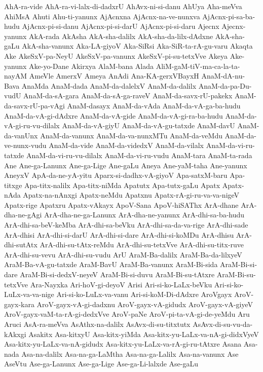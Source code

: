 {AhA-ra-vide
AhA-ra-vi-lalx-di-dadxrU
AhAvx-ni-si-danu
AhUya
Aha-meVva
AhiMsA
Ahuti
Ahu-ti-yanunx
AjAcnxna
AjAcnx-na-ve-nunxva
AjAcnx-pi-sa-ba-hudu
AjAcnx-pi-si-danu
AjAcnx-pi-si-darU
AjAcnx-pi-si-daru
Ajecnx
Ajecnx-yanunx
AkA-rada
AkAsha
AkA-sha-dalilx
AkA-sha-da-lilx-dAdxne
AkA-sha-gaLu
AkA-sha-vanunx
Aka-LA-giyoV
Aka-SiRsi
Aka-SiR-ta-rA-gu-varu
Akaqta
Ake
AkeSxV-pa-NeyU
AkeSxV-pa-vanunx
AkeSxV-pi-su-tetxVve
Akeya
Ake-yanunx
Ake-yo-Dane
Akirxya
AlaM-bana
Alada
AliM-gaM-tiV-ma-ca-la-ta-nayAM
AmeVle
AmerxV
Ameya
AnAdi
Ana-KA-gerxVBayxH
AnaM-dA-nu-Bava
AnaMda
AnaM-dada
AnaM-da-dalelxV
AnaM-da-dalilx
AnaM-da-pa-Du-vudU
AnaM-da-sA-gara
AnaM-da-sA-ga-raveV
AnaM-da-savx-rU-pakekx
AnaM-da-savx-rU-pa-vAgi
AnaM-dasayx
AnaM-da-vAda
AnaM-da-vA-ga-ba-hudu
AnaM-da-vA-gi-dAdxre
AnaM-da-vA-gide
AnaM-da-vA-gi-ra-ba-hudu
AnaM-da-vA-gi-ru-vu-dilalx
AnaM-da-vA-giyU
AnaM-da-vA-gu-tatxde
AnaM-davU
AnaM-da-vanUnx
AnaM-da-vanunx
AnaM-da-va-nunxMTu
AnaM-da-veMdu
AnaM-da-ve-nunx-vudu
AnaM-da-vide
AnaM-da-videdxV
AnaM-da-vilalx
AnaM-da-vi-ru-tatxde
AnaM-da-vi-ru-vu-dilalx
AnaM-da-vi-ru-vudu
AnaM-tara
AnaM-ta-rada
Ane
Ane-ga-Lanunx
Ane-ga-Lige
Ane-gaLu
Aneya
Ane-yaM-taha
Ane-yanunx
AneyxV
ApA-da-ne-yA-yitu
Aparx-si-dadhx-vA-giyoV
Apa-satxM-baru
Apa-titxge
Apa-titx-nalilx
Apa-titx-niMda
Apatutx
Apa-tutx-gaLu
Apatx
Apatx-nAda
Apatx-na-nAnxgi
Apatx-neMdu
Apatxnu
Apatx-rA-gi-ru-va-va-nigeV
Apatx-rige
Apatxru
Apatx-vAkayx
ApoV-Sana
ApoV-hiSAThx
ArA-dhane
ArA-dha-ne-gAgi
ArA-dha-ne-ga-Lanunx
ArA-dha-ne-yanunx
ArA-dhi-sa-ba-hudu
ArA-dhi-sa-beV-keMba
ArA-dhi-sa-beVku
ArA-dhi-sa-da-va-rige
ArA-dhi-sade
ArA-dhisi
ArA-dhi-si-darU
ArA-dhi-si-dare
ArA-dhi-si-koMDu
ArA-dhisu
ArA-dhi-sutAtx
ArA-dhi-su-tAtx-reMdu
ArA-dhi-su-tetxVve
ArA-dhi-su-titx-ruve
ArA-dhi-su-vevu
ArA-dhi-su-vudu
ArU
AraM-Ba-dalilx
AraM-Ba-da-lilxyeV
AraM-Ba-vA-gu-tatxde
AraM-BavU
AraM-Ba-vanunx
AraM-Bi-sida
AraM-Bi-si-dare
AraM-Bi-si-dedxV-neyeV
AraM-Bi-si-duvu
AraM-Bi-su-tAtxre
AraM-Bi-su-tetxVve
Ara-Nayxka
Ari-hoV-gi-deyoV
Arisi
Ari-si-ko-LaLx-beVku
Ari-si-ko-LuLx-va-va-nige
Ari-si-ko-LuLx-va-vanu
Ari-si-koM-Di-dAdxre
AroVgayx
AroV-gayx-kara
AroV-gayx-vA-gi-dadxnu
AroV-gayx-vA-gidudx
AroV-gayx-vA-giyeV
AroV-gayx-vaM-ta-rA-gi-dedxVve
AroV-paNe
AroV-pi-ta-vA-gi-de-yeMdu
Aru
Aruci
AsA-ra-meVva
AsAthx-na-dalilx
AsAvx-di-su-titxtutx
AsAvx-di-su-vu-da-kAkxgi
Asakitx
Asa-kitxyU
Asa-kitx-yiMda
Asa-kitx-yu-LaLx-va-nA-gi-didxVyeV
Asa-kitx-yu-LaLx-va-nA-gidudx
Asa-kitx-yu-LaLx-va-rA-gi-ru-tAtxre
Asana
Asa-nada
Asa-na-dalilx
Asa-na-ga-LaMtha
Asa-na-ga-Lalilx
Asa-na-vanunx
Ase
AseVtu
Ase-ga-Lanunx
Ase-ga-Lige
Ase-ga-Li-lalxde
Ase-gaLu
}
